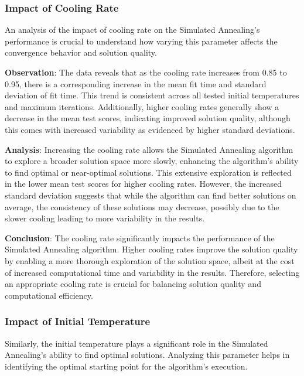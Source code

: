\documentclass[
]{article}
\begin{document}
    \subsubsection{Impact of Cooling Rate}

    An analysis of the impact of cooling rate on the Simulated Annealing’s performance is crucial to understand how varying this parameter affects the convergence behavior and solution quality.

    \textbf{Observation}: The data reveals that as the cooling rate increases from 0.85 to 0.95, there is a corresponding increase in the mean fit time and standard deviation of fit time. This trend is consistent across all tested initial temperatures and maximum iterations. Additionally, higher cooling rates generally show a decrease in the mean test scores, indicating improved solution quality, although this comes with increased variability as evidenced by higher standard deviations.

    \textbf{Analysis}: Increasing the cooling rate allows the Simulated Annealing algorithm to explore a broader solution space more slowly, enhancing the algorithm's ability to find optimal or near-optimal solutions. This extensive exploration is reflected in the lower mean test scores for higher cooling rates. However, the increased standard deviation suggests that while the algorithm can find better solutions on average, the consistency of these solutions may decrease, possibly due to the slower cooling leading to more variability in the results.

    \textbf{Conclusion}: The cooling rate significantly impacts the performance of the Simulated Annealing algorithm. Higher cooling rates improve the solution quality by enabling a more thorough exploration of the solution space, albeit at the cost of increased computational time and variability in the results. Therefore, selecting an appropriate cooling rate is crucial for balancing solution quality and computational efficiency.

    \subsubsection{Impact of Initial Temperature}

    Similarly, the initial temperature plays a significant role in the Simulated Annealing’s ability to find optimal solutions. Analyzing this parameter helps in identifying the optimal starting point for the algorithm’s execution.
\end{document}
